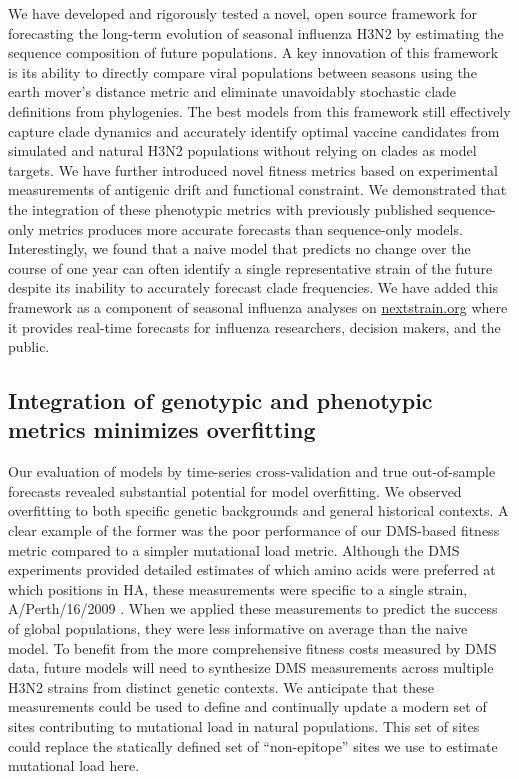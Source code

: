 We have developed and rigorously tested a novel, open source framework for forecasting the long-term evolution of seasonal influenza H3N2 by estimating the sequence composition of future populations.
A key innovation of this framework is its ability to directly compare viral populations between seasons using the earth mover's distance metric \citep{Rubner1998} and eliminate unavoidably stochastic clade definitions from phylogenies.
The best models from this framework still effectively capture clade dynamics and accurately identify optimal vaccine candidates from simulated and natural H3N2 populations without relying on clades as model targets.
We have further introduced novel fitness metrics based on experimental measurements of antigenic drift and functional constraint.
We demonstrated that the integration of these phenotypic metrics with previously published sequence-only metrics produces more accurate forecasts than sequence-only models.
Interestingly, we found that a naive model that predicts no change over the course of one year can often identify a single representative strain of the future despite its inability to accurately forecast clade frequencies.
We have added this framework as a component of seasonal influenza analyses on \href{https://nextstrain.org/flu}{nextstrain.org} where it provides real-time forecasts for influenza researchers, decision makers, and the public.

\subsection*{Integration of genotypic and phenotypic metrics minimizes overfitting}

Our evaluation of models by time-series cross-validation and true out-of-sample forecasts revealed substantial potential for model overfitting.
We observed overfitting to both specific genetic backgrounds and general historical contexts.
A clear example of the former was the poor performance of our DMS-based fitness metric compared to a simpler mutational load metric.
Although the DMS experiments provided detailed estimates of which amino acids were preferred at which positions in HA, these measurements were specific to a single strain, A/Perth/16/2009 \citep{Lee2018}.
When we applied these measurements to predict the success of global populations, they were less informative on average than the naive model.
To benefit from the more comprehensive fitness costs measured by DMS data, future models will need to synthesize DMS measurements across multiple H3N2 strains from distinct genetic contexts.
We anticipate that these measurements could be used to define and continually update a modern set of sites contributing to mutational load in natural populations.
This set of sites could replace the statically defined set of ``non-epitope'' sites we use to estimate mutational load here.

